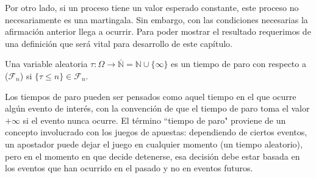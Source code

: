 Por otro lado, si un proceso tiene un valor esperado constante, este proceso no necesariamente es una martingala. Sin embargo, con las condiciones necesarias la afirmación anterior llega a ocurrir. Para poder mostrar el resultado requerimos de una definición que será vital para desarrollo de este capítulo.

\begin{definition}
Una variable aleatoria $\tau: \Omega \rightarrow \bar{\mathbb{N}} = \mathbb{N} \cup \{ \infty \}$ es un tiempo de paro con respecto a ($\mathcal{F}_n$) si $\{ \tau \leq n \} \in \mathcal{F}_n$.
\end{definition}

Los tiempos de paro pueden ser pensados como aquel tiempo en el que ocurre algún evento de interés, con la convención de que el tiempo de paro toma el valor $+ \infty$ si el evento nunca ocurre. El término ``tiempo de paro"  proviene de un concepto involucrado con los juegos de apuestas: dependiendo de ciertos eventos, un apostador puede dejar el juego en cualquier momento (un tiempo aleatorio), pero en el momento en que decide detenerse, esa decisión debe estar basada en los eventos que han ocurrido en el pasado y no en eventos futuros.

